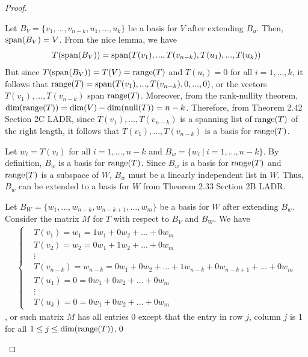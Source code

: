 \begin{proof}
\begin{enumerate}[(a)]
    Let $B_V=\{v_1,...,v_{n-k},u_1,...,u_k\}$ be a basis for $V$ after extending $B_u$.
    Then, $\textnormal{span}(B_V)=V$. From the nice lemma, we have 
    \[
        \begin{aligned}
            T(\textnormal{span}(B_V))=\textnormal{span}(T(v_1),...,T(v_{n-k}),T(u_1),...,T(u_k))
        \end{aligned}
    \]
    But since $T(\textnormal{span}(B_V))=T(V)=\textnormal{range}(T)$ and $T(u_i)=0$ for all $i=1,...,k$, it follows that $\textnormal{range}(T)=\textnormal{span}(T(v_1),...,T(v_{n-k}),0,...,0)$, or the vectors $T(v_1),...,T(v_{n-k})$ span $\textnormal{range}(T)$.
    Moreover, from the rank-nullity theorem, $\textnormal{dim}(\textnormal{range}(T))=\textnormal{dim}(V)-\textnormal{dim}(\textnormal{null}(T))=n-k$.
    Therefore, from Theorem 2.42 Section 2C LADR, since $T(v_1),...,T(v_{n-k})$ is a spanning list of $\textnormal{range}(T)$ of the right length, it follows that $T(v_1),...,T(v_{n-k})$ is a basis for $\textnormal{range}(T)$.

    Let $w_i=T(v_i)$ for all $i=1,...,n-k$ and $B_w=\{w_i\ |\ i=1,...,n-k\}$.
    By definition, $B_w$ is a basis for $\textnormal{range}(T)$.
    Since $B_w$ is a basis for $\textnormal{range}(T)$ and $\textnormal{range}(T)$ is a subspace of $W$, $B_w$ must be a linearly independent list in $W$.
    Thus, $B_w$ can be extended to a basis for $W$ from Theorem 2.33 Section 2B LADR.

    Let $B_W=\{w_1,...,w_{n-k},w_{n-k+1},...,w_m\}$ be a basis for $W$ after extending $B_w$.
    Consider the matrix $M$ for $T$ with respect to $B_V$ and $B_W$. We have
    \begin{align*}
        \begin{cases}
            &T(v_1)=w_1=1w_1+0w_2+...+0w_m\\
            &T(v_2)=w_2=0w_1+1w_2+...+0w_m\\
            &\vdots\\
            &T(v_{n-k})=w_{n-k}=0w_1+0w_2+...+1w_{n-k}+0w_{n-k+1}+...+0w_m\\
            &T(u_1)=0=0w_1+0w_2+...+0w_m\\
            &\vdots\\
            &T(u_k)=0=0w_1+0w_2+...+0w_m
        \end{cases}
    \end{align*}
    , or such matrix $M$ has all entries 0 except that the entry in row $j$, column $j$ is 1 for all $1\leq j\leq \textnormal{dim}(\textnormal{range}(T))$.\qed
    \end{enumerate}
    \renewcommand{\qedsymbol}{}
\end{proof}
